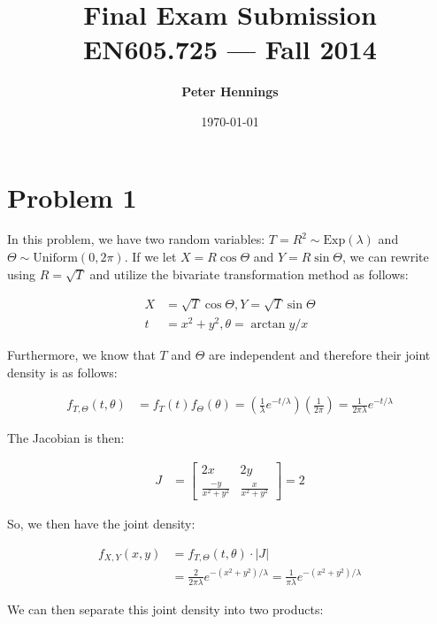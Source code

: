 \documentclass[11pt]{article}
\title{\bf Final Exam Submission\\[2ex] 
       \rm\normalsize EN605.725 --- Fall 2014}
\date{\today}
\author{\bf Peter Hennings}
\begin{document}
\maketitle

\section*{Problem 1} 

In this problem, we have two random variables:
$T = R^2 \sim \mathrm{Exp}(\lambda)$ and $\Theta \sim
\mathrm{Uniform}(0,2 \pi)$.  If we let $X = R \cos{\Theta}$ and $Y = R
\sin{\Theta}$, we can rewrite using $R = \sqrt{T}$ and utilize the
bivariate transformation method as follows:

\begin{align*}
  X &= \sqrt{T} \cos{\Theta}, Y = \sqrt{T} \sin{\Theta} \\
  t &= x^2 + y^2, \theta = \arctan{y/x}
\end{align*}

Furthermore, we know that $T$ and $\Theta$ are independent and
therefore their joint density is as follows:

\begin{align*}
  f_{T,\Theta}(t,\theta) &= f_T(t) f_{\Theta}(\theta) = \left(
                           \frac{1}{\lambda} e^{-t/\lambda}  \right)
                           \left( \frac{1}{2 \pi} \right) = \frac{1}{2
                           \pi \lambda} e^{-t/\lambda}
\end{align*}

The Jacobian is then:

\begin{align*}
  J &= \begin{bmatrix} 2x & 2y \\ \frac{-y}{x^2+y^2} &
    \frac{x}{x^2+y^2} \end{bmatrix} = 2
\end{align*}

So, we then have the joint density:

\begin{align*}
  f_{X,Y}(x,y) &= f_{T,\Theta}(t,\theta) \cdot \left| J \right| \\
  &= \frac{2}{2 \pi \lambda} e^{-(x^2+y^2)/\lambda} = \frac{1}{\pi \lambda} e^{-(x^2+y^2)/\lambda}
\end{align*}

We can then separate this joint density into two products:
\end{document}
